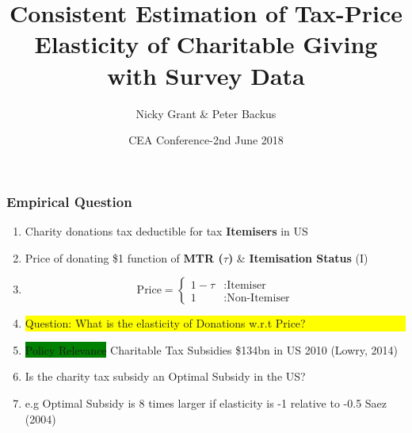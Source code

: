 \documentclass[options]{beamer}
\begin{document}
\title[ Tax-Price  Response of Donations]{ Consistent Estimation of Tax-Price Elasticity of Charitable Giving with Survey Data }

\author[NG \& PB]{ Nicky Grant \& Peter Backus}


\date[ EEA- 22nd August 2016]{CEA Conference-2nd June 2018}


\maketitle




\begin{frame}
\frametitle{Empirical Question}
\begin{enumerate}
	
	\item Charity donations tax deductible for tax \textbf{Itemisers} in US
	
	\vspace{1pt}
	\item Price  of donating \$1  function of\textbf{ MTR ($\tau$)} \& \textbf{Itemisation Status} (I) 

		\vspace{10pt}
	 \item[] \[\textrm{Price} = \left\{
	 \begin{array}{lr}
	 1-\tau & : \textrm{Itemiser}\\
	 1 & :\textrm{Non-Itemiser}
	 \end{array}
	 \right.
	 \]
	
	\item[] \colorbox{yellow}{\parbox{\textwidth}{ Question: What is the  elasticity of Donations w.r.t   Price?}}
		\vspace{1pt}
	\footnotesize	
	\item[] \colorbox{green}{Policy Relevance} Charitable Tax Subsidies  \$134bn in US 2010 (Lowry, 2014) \vspace{8pt}

	\item[-]  Is the charity tax subsidy an Optimal Subsidy in the US?
	\item[] e.g Optimal Subsidy is 8 times larger if elasticity is -1 relative to -0.5 Saez (2004)
	
\end{enumerate}
\end{frame}
	
\end{document}
